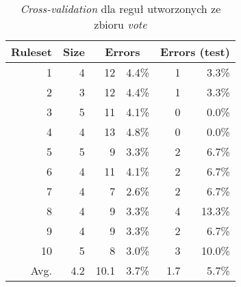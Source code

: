 \begin{table}
\begin{tabular}{|r|r|rr|rr|}
\hline
 Ruleset & 
 Size & 
 \multicolumn{2}{|c|}{Errors} & 
 \multicolumn{2}{|c|}{Errors (test)} \\
\hline\hline
       1 &    4 &   12 & 4.4\% &    1 &  3.3\% \\
       2 &    3 &   12 & 4.4\% &    1 &  3.3\% \\
       3 &    5 &   11 & 4.1\% &    0 &  0.0\% \\
       4 &    4 &   13 & 4.8\% &    0 &  0.0\% \\
       5 &    5 &    9 & 3.3\% &    2 &  6.7\% \\
       6 &    4 &   11 & 4.1\% &    2 &  6.7\% \\
       7 &    4 &    7 & 2.6\% &    2 &  6.7\% \\
       8 &    4 &    9 & 3.3\% &    4 & 13.3\% \\
       9 &    4 &    9 & 3.3\% &    2 &  6.7\% \\
      10 &    5 &    8 & 3.0\% &    3 & 10.0\% \\
\hline\hline
    Avg. &  4.2 & 10.1 & 3.7\% &  1.7 &  5.7\% \\
\hline
\end{tabular}
\caption{\emph{Cross-validation} dla reguł utworzonych ze zbioru \emph{vote}}
\label{p2t2-vote-rules-cv}
\end{table}
